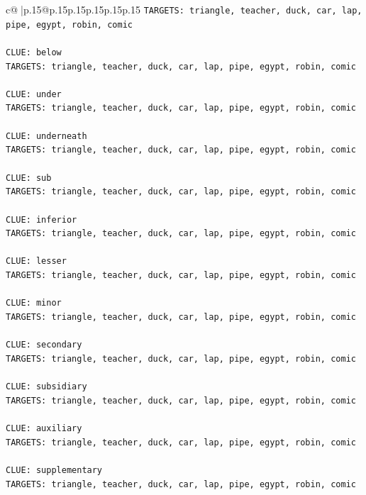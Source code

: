 \documentclass{article}
\begin{document}
{\begin{supertabular}{c@{$\;$}|p{.15\linewidth}@{}p{.15\linewidth}p{.15\linewidth}p{.15\linewidth}p{.15\linewidth}p{.15\linewidth}}
{{{\texttt{TARGETS: triangle, teacher, duck, car, lap, pipe, egypt, robin, comic} \\
\\ 
\texttt{CLUE: below} \\
\texttt{TARGETS: triangle, teacher, duck, car, lap, pipe, egypt, robin, comic} \\
\\ 
\texttt{CLUE: under} \\
\texttt{TARGETS: triangle, teacher, duck, car, lap, pipe, egypt, robin, comic} \\
\\ 
\texttt{CLUE: underneath} \\
\texttt{TARGETS: triangle, teacher, duck, car, lap, pipe, egypt, robin, comic} \\
\\ 
\texttt{CLUE: sub} \\
\texttt{TARGETS: triangle, teacher, duck, car, lap, pipe, egypt, robin, comic} \\
\\ 
\texttt{CLUE: inferior} \\
\texttt{TARGETS: triangle, teacher, duck, car, lap, pipe, egypt, robin, comic} \\
\\ 
\texttt{CLUE: lesser} \\
\texttt{TARGETS: triangle, teacher, duck, car, lap, pipe, egypt, robin, comic} \\
\\ 
\texttt{CLUE: minor} \\
\texttt{TARGETS: triangle, teacher, duck, car, lap, pipe, egypt, robin, comic} \\
\\ 
\texttt{CLUE: secondary} \\
\texttt{TARGETS: triangle, teacher, duck, car, lap, pipe, egypt, robin, comic} \\
\\ 
\texttt{CLUE: subsidiary} \\
\texttt{TARGETS: triangle, teacher, duck, car, lap, pipe, egypt, robin, comic} \\
\\ 
\texttt{CLUE: auxiliary} \\
\texttt{TARGETS: triangle, teacher, duck, car, lap, pipe, egypt, robin, comic} \\
\\ 
\texttt{CLUE: supplementary} \\
\texttt{TARGETS: triangle, teacher, duck, car, lap, pipe, egypt, robin, comic} \\
}}}
\end{supertabular}}
\end{document}
